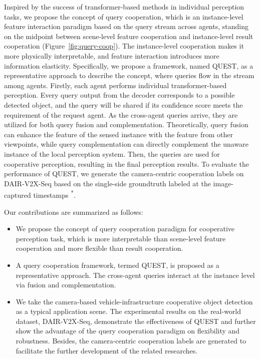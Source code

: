 \documentclass[letterpaper, 10 pt, conference]{ieeeconf}  %
\begin{document}
Inspired by the success of transformer-based methods in individual perception tasks\cite{detr, detr3d, motr}, we propose the concept of query cooperation, which is an instance-level feature interaction paradigm based on the query stream across agents, standing on the midpoint between scene-level feature cooperation and instance-level result cooperation (Figure~\ref{fig:query-coop}). The instance-level cooperation makes it more physically interpretable, and feature interaction introduces more information elasticity. Specifically, we propose a framework, named QUEST, as a representative approach to describe the concept, where queries flow in the stream among agents. Firstly, each agent performs individual transformer-based perception. Every query output from the decoder corresponds to a possible detected object, and the query will be shared if its confidence score meets the requirement of the request agent. As the cross-agent queries arrive, they are utilized for both query fusion and complementation. Theoretically, query fusion can enhance the feature of the sensed instance with the feature from other viewpoints, while query complementation can directly complement the unaware instance of the local perception system. Then, the queries are used for cooperative perception, resulting in the final perception results. To evaluate the performance of QUEST, we generate the camera-centric cooperation labels on DAIR-V2X-Seq based on the single-side groundtruth labeled at the image-captured timestamps \textsuperscript{*}.


Our contributions are summarized as follows:
\begin{itemize}
  \item We propose the concept of query cooperation paradigm for cooperative perception task, which is more interpretable than scene-level feature cooperation and more flexible than result cooperation.
  \item A query cooperation framework, termed QUEST, is proposed as a representative approach. The cross-agent queries interact at the instance level via fusion and complementation.
  \item We take the camera-based vehicle-infrastructure cooperative object detection as a typical application scene. The experimental results on the real-world dataset, DAIR-V2X-Seq, demonstrate the effectiveness of QUEST and further show the advantage of the query cooperation paradigm on flexibility and robustness. Besides, the camera-centric cooperation labels are generated to facilitate the further development of the related researches.
\end{itemize}
\end{document}
